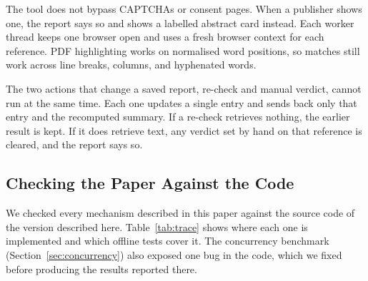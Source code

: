 \documentclass{article}
\begin{document}
The tool does not bypass CAPTCHAs or consent pages. When a publisher shows one, the report says so and shows a labelled abstract card instead. Each worker thread keeps one browser open and uses a fresh browser context for each reference. PDF highlighting works on normalised word positions, so matches still work across line breaks, columns, and hyphenated words.

The two actions that change a saved report, re-check and manual verdict, cannot run at the same time. Each one updates a single entry and sends back only that entry and the recomputed summary. If a re-check retrieves nothing, the earlier result is kept. If it does retrieve text, any verdict set by hand on that reference is cleared, and the report says so.

\subsection{Checking the Paper Against the Code}
\label{sec:trace}

We checked every mechanism described in this paper against the source code of the version described here. Table~\ref{tab:trace} shows where each one is implemented and which offline tests cover it. The concurrency benchmark (Section~\ref{sec:concurrency}) also exposed one bug in the code, which we fixed before producing the results reported there.
\end{document}
